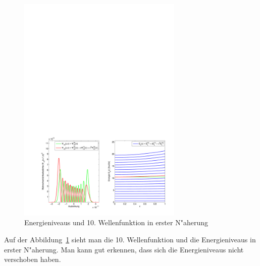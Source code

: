 \begin{refsection}
\begin{figure}[h]	%
\centering
\includegraphics[width=0.7\textwidth]{anharmonisch/images/x3/Stoerung2Wellenfunktion.pdf}
\caption{Energieniveaus und 10. Wellenfunktion in erster N"aherung
\label{skript:x3_Stoerung1Wellenfunktion}}
\end{figure}

Auf der Abbildung~\ref{skript:x3_Stoerung1Wellenfunktion} sieht man die 10. Wellenfunktion und die Energieniveaus in erster N"aherung. Man kann gut erkennen, dass sich die Energieniveaus nicht verschoben haben.


\end{refsection}
